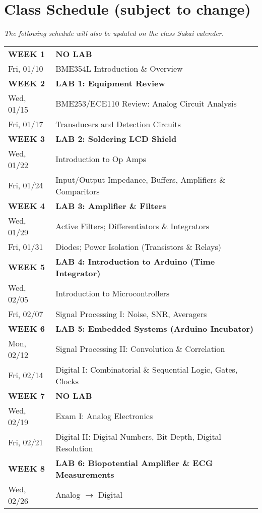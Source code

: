 \section{Class Schedule (subject to change)}
\emph{The following schedule will also be updated on the class Sakai calender.}\\
\begin{tabular}{|l|l|} \hline
{\bf WEEK 1}      &   {\bf NO LAB} \\
Fri, 01/10  &   BME354L Introduction \& Overview \\ \hline
{\bf WEEK 2}      &   {\bf LAB 1: Equipment Review} \\
Wed, 01/15  &   BME253/ECE110 Review: Analog Circuit Analysis\\
Fri, 01/17  &   Transducers and Detection Circuits \\ \hline
{\bf WEEK 3}      &   {\bf LAB 2: Soldering LCD Shield} \\
Wed, 01/22  &   Introduction to Op Amps \\ 
Fri, 01/24  &   Input/Output Impedance, Buffers, Amplifiers \& Comparitors \\ \hline
{\bf WEEK 4}      &   {\bf LAB 3: Amplifier \& Filters} \\
Wed, 01/29  &   Active Filters; Differentiators \& Integrators \\
Fri, 01/31  &   Diodes; Power Isolation (Transistors \& Relays) \\ \hline
{\bf WEEK 5}      &   {\bf LAB 4: Introduction to Arduino (Time Integrator)} \\
Wed, 02/05  &   Introduction to Microcontrollers \\
Fri, 02/07  &   Signal Processing I: Noise, SNR, Averagers \\ \hline
{\bf WEEK 6}      &   {\bf LAB 5: Embedded Systems (Arduino Incubator)} \\
Mon, 02/12  &   Signal Processing II: Convolution \& Correlation \\ 
Fri, 02/14  &   Digital I: Combinatorial \& Sequential Logic, Gates, Clocks \\ \hline
{\bf WEEK 7}      &   {\bf NO LAB} \\
Wed, 02/19  &   Exam I: Analog Electronics \\ 
Fri, 02/21  &   Digital II: Digital Numbers, Bit Depth, Digital Resolution \\ \hline
{\bf WEEK 8}      &   {\bf LAB 6: Biopotential Amplifier \& ECG Measurements} \\
Wed, 02/26  &   Analog $\rightarrow$ Digital \\ 

\end{tabular}

